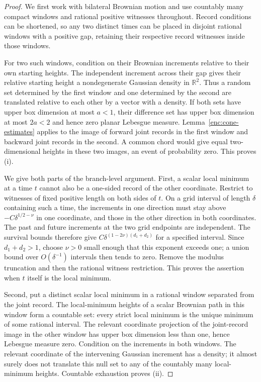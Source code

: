 \documentclass[11pt]{article}
\numberwithin{equation}{section}
\theoremstyle{definition}
\theoremstyle{remark}
\newcommand{\R}{\mathbb R}
\newcommand{\1}{\mathbf 1}
\begin{document}
\begin{proof}
We first work with bilateral Brownian motion and use countably many
compact windows and rational positive witnesses throughout.  Record
conditions can be shortened, so any two distinct times can be placed
in disjoint rational windows with a positive gap, retaining their
respective record witnesses inside those windows.

For two such windows, condition on their Brownian increments relative
to their own starting heights.  The independent increment across their
gap gives their relative starting height a nondegenerate Gaussian
density in $\R^2$.  Thus a random set determined by the first window and
one determined by the second are translated relative to each other by
a vector with a density.  If both sets have upper box dimension at most
$a<1$, their difference set has upper box dimension at most $2a<2$ and
hence zero planar Lebesgue measure.  Lemma~\ref{enc:cone-estimates}
applies to the image of forward joint records in the first window and
backward joint records in the second.  A common chord would give equal
two-dimensional heights in these two images, an event of probability
zero.  This proves (i).

We give both parts of the branch-level argument.  First, a scalar local
minimum at a time $t$ cannot also be a one-sided record of the other
coordinate.  Restrict to witnesses of fixed positive length on both
sides of $t$.  On a grid interval of length $\delta$ containing such
a time, the increments in one direction must stay above
$-C\delta^{1/2-\nu}$ in one coordinate, and those in the other direction
in both coordinates.  The past and future increments at the two grid
endpoints are independent.  The survival bounds therefore give
$C\delta^{(1-2\nu)(d_1+d_2)}$ for a specified interval.  Since
$d_1+d_2>1$, choose $\nu>0$ small enough that this exponent exceeds
one; a union bound over $O(\delta^{-1})$ intervals then tends to
zero.  Remove the modulus truncation and then the rational witness
restriction.  This proves the assertion when $t$ itself is the local
minimum.

Second, put a distinct scalar local minimum in a rational window
separated from the joint record.  The local-minimum heights of a scalar
Brownian path in this window form a countable set: every strict local
minimum is the unique minimum of some rational interval.  The relevant
coordinate projection of the joint-record image in the other window
has upper box dimension less than one, hence Lebesgue measure zero.
Condition on the increments in both windows.  The relevant coordinate
of the intervening Gaussian increment has a density; it almost surely
does not translate this null set to any of the countably many
local-minimum heights.  Countable exhaustion proves (ii).


\end{proof}
\end{document}
